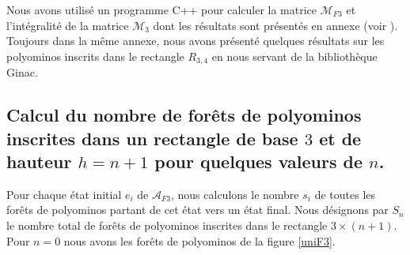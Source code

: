  
 Nous avons utilisé un programme C++ pour calculer la matrice $\mathcal{M}_{F3}$ et l'intégralité de la matrice $\mathcal{M}_{3}$ dont les résultats sont présentés en annexe (voir \cite{Annexe}). Toujours dans la même annexe, nous avons présenté quelques résultats sur les  polyominos inscrits dans le rectangle $R_{3,4}$ en nous servant de la bibliothèque Ginac.
 \begin{spacing}{0.30}
\section{Calcul du nombre de forêts de polyominos inscrites dans un rectangle de base $3$ et de hauteur $h=n+1$ pour quelques valeurs de $n$. }
\end{spacing}
Pour chaque état initial $e_{i}$ de $\mathcal{A}_{F3}$, nous calculons le nombre $s_{i}$ de toutes les forêts de polyominos partant de cet état vers un état final. Nous désignons par $S_{n}$ le nombre total de forêts de polyominos inscrites dans le rectangle $3\times (n+1)$. Pour $n=0$  nous avons les forêts de polyominos de la figure \ref{uniF3}.
 

